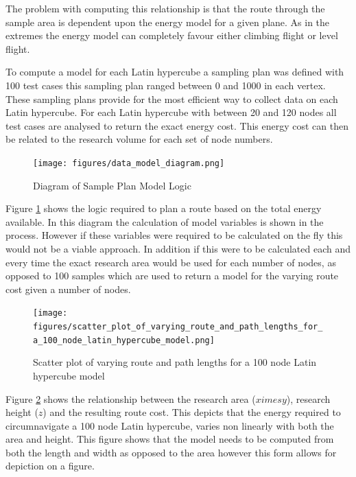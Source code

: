 \documentclass[a4paper,12pt,twoside]{article}
\begin{document}
The problem with computing this relationship is that the route through the sample area is dependent upon the energy model for a given plane. As in the extremes the energy model can completely favour either climbing flight or level flight.

To compute a model for each Latin hypercube a sampling plan was defined with 100 test cases this sampling plan ranged between 0 and 1000 in each vertex. These sampling plans provide for the most efficient way to collect data on each Latin hypercube. For each Latin hypercube with between 20 and 120 nodes all test cases are analysed to return the exact energy cost. This energy cost can then be related to the research volume for each set of node numbers.

\begin{figure}
\centering
\texttt{[image: figures/data\_model\_diagram.png]} 
\caption{Diagram of Sample Plan Model Logic}
\label{fig:data_model_diagram}
\end{figure}

Figure \ref{fig:data_model_diagram} shows the logic required to plan a route based on the total energy available. In this diagram the calculation of model variables is shown in the process. However if these variables were required to be calculated on the fly this would not be a viable approach. In addition if this were to be calculated each and every time the exact research area would be used for each number of nodes, as opposed to 100 samples which are used to return a model for the varying route cost given a number of nodes.

\begin{figure}
\centering
\texttt{[image: figures/scatter\_plot\_of\_varying\_route\_and\_path\_lengths\_for\_a\_100\_node\_latin\_hypercube\_model.png]} 
\caption{Scatter plot of varying route and path lengths for a 100 node Latin hypercube model}
\label{fig:scatter_plot_of_varying_route_and_path_lengths_for_a_100_node_latin_hypercube_model}
\end{figure}

Figure \ref{fig:scatter_plot_of_varying_route_and_path_lengths_for_a_100_node_latin_hypercube_model} shows the relationship between the research area ($x 	imes y$), research height ($z$) and the resulting route cost. This depicts that the energy required to circumnavigate a 100 node Latin hypercube, varies non linearly with both the area and height. This figure shows that the model needs to be computed from both the length and width as opposed to the area however this form allows for depiction on a figure.
\end{document}
